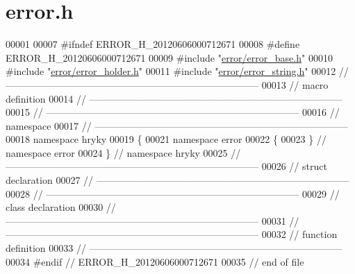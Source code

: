 \hypertarget{error_8h_source}{\section{error.\-h}
}

\begin{DoxyCode}
00001 
00007 \textcolor{preprocessor}{#ifndef ERROR\_H\_20120606000712671}
00008 \textcolor{preprocessor}{}\textcolor{preprocessor}{#define ERROR\_H\_20120606000712671}
00009 \textcolor{preprocessor}{}\textcolor{preprocessor}{#include "\hyperlink{error__base_8h}{error/error_base.h}"}
00010 \textcolor{preprocessor}{#include "\hyperlink{error__holder_8h}{error/error_holder.h}"}
00011 \textcolor{preprocessor}{#include "\hyperlink{error__string_8h}{error/error_string.h}"}
00012 \textcolor{comment}{//
      ------------------------------------------------------------------------------}
00013 \textcolor{comment}{// macro definition}
00014 \textcolor{comment}{//
      ------------------------------------------------------------------------------}
00015 \textcolor{comment}{//
      ------------------------------------------------------------------------------}
00016 \textcolor{comment}{// namespace}
00017 \textcolor{comment}{//
      ------------------------------------------------------------------------------}
00018 \textcolor{keyword}{namespace }hryky
00019 \{
00021 \textcolor{keyword}{namespace }error
00022 \{
00023 \} \textcolor{comment}{// namespace error}
00024 \} \textcolor{comment}{// namespace hryky}
00025 \textcolor{comment}{//
      ------------------------------------------------------------------------------}
00026 \textcolor{comment}{// struct declaration}
00027 \textcolor{comment}{//
      ------------------------------------------------------------------------------}
00028 \textcolor{comment}{//
      ------------------------------------------------------------------------------}
00029 \textcolor{comment}{// class declaration}
00030 \textcolor{comment}{//
      ------------------------------------------------------------------------------}
00031 \textcolor{comment}{//
      ------------------------------------------------------------------------------}
00032 \textcolor{comment}{// function definition}
00033 \textcolor{comment}{//
      ------------------------------------------------------------------------------}
00034 \textcolor{preprocessor}{#endif // ERROR\_H\_20120606000712671}
00035 \textcolor{preprocessor}{}\textcolor{comment}{// end of file}
\end{DoxyCode}
